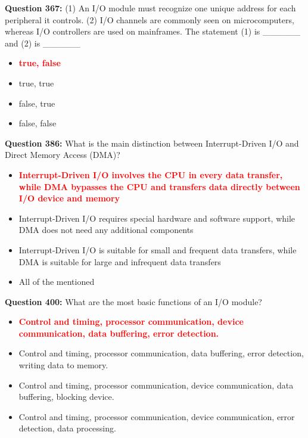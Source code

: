 \documentclass[12pt,a4paper]{article}
\begin{document}
\textbf{Question 367:} (1) An I/O module must recognize one unique address for each peripheral it controls. (2) I/O channels are commonly seen on microcomputers, whereas I/O controllers are used on mainframes. The statement (1) is ______ and (2) is ______

\begin{itemize}
    \item[\textbf{A.}] \textcolor{red}{\textbf{true, false}}
    \item[\textbf{B.}] true, true
    \item[\textbf{C.}] false, true
    \item[\textbf{D.}] false, false
\end{itemize}

\vspace{0.5cm}

\textbf{Question 386:} What is the main distinction between Interrupt-Driven I/O and Direct Memory Access (DMA)?

\begin{itemize}
    \item[\textbf{A.}] \textcolor{red}{\textbf{Interrupt-Driven I/O involves the CPU in every data transfer, while DMA bypasses the CPU and transfers data directly between I/O device and memory}}
    \item[\textbf{B.}] Interrupt-Driven I/O requires special hardware and software support, while DMA does not need any additional components
    \item[\textbf{C.}] Interrupt-Driven I/O is suitable for small and frequent data transfers, while DMA is suitable for large and infrequent data transfers
    \item[\textbf{D.}] All of the mentioned
\end{itemize}

\vspace{0.5cm}

\textbf{Question 400:} What are the most basic functions of an I/O module?

\begin{itemize}
    \item[\textbf{A.}] \textcolor{red}{\textbf{Control and timing, processor communication, device communication, data buffering, error detection.}}
    \item[\textbf{B.}] Control and timing, processor communication, data buffering, error detection, writing data to memory.
    \item[\textbf{C.}] Control and timing, processor communication, device communication, data buffering, blocking device.
    \item[\textbf{D.}] Control and timing, processor communication, device communication, error detection, data processing.
\end{itemize}
\end{document}
